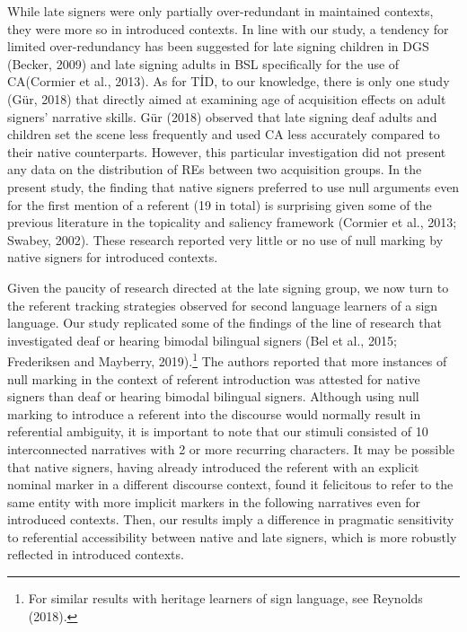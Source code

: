 \documentclass[]{elsarticle} %
\begin{document}
While late signers were only partially over-redundant in maintained
contexts, they were more so in introduced contexts. In line with our
study, a tendency for limited over-redundancy has been suggested for
late signing children in DGS (Becker, 2009) and late signing adults in
BSL specifically for the use of CA(Cormier et al., 2013). As for TİD, to
our knowledge, there is only one study (Gür, 2018) that directly aimed
at examining age of acquisition effects on adult signers' narrative
skills. Gür (2018) observed that late signing deaf adults and children
set the scene less frequently and used CA less accurately compared to
their native counterparts. However, this particular investigation did
not present any data on the distribution of REs between two acquisition
groups. In the present study, the finding that native signers preferred
to use null arguments even for the first mention of a referent (19 in
total) is surprising given some of the previous literature in the
topicality and saliency framework (Cormier et al., 2013; Swabey, 2002).
These research reported very little or no use of null marking by native
signers for introduced contexts.

Given the paucity of research directed at the late signing group, we now
turn to the referent tracking strategies observed for second language
learners of a sign language. Our study replicated some of the findings
of the line of research that investigated deaf or hearing bimodal
bilingual signers (Bel et al., 2015; Frederiksen and Mayberry,
2019).\footnote{For similar results with heritage learners of sign language, see Reynolds (2018).}
The authors reported that more instances of null marking in the context
of referent introduction was attested for native signers than deaf or
hearing bimodal bilingual signers. Although using null marking to
introduce a referent into the discourse would normally result in
referential ambiguity, it is important to note that our stimuli
consisted of 10 interconnected narratives with 2 or more recurring
characters. It may be possible that native signers, having already
introduced the referent with an explicit nominal marker in a different
discourse context, found it felicitous to refer to the same entity with
more implicit markers in the following narratives even for introduced
contexts. Then, our results imply a difference in pragmatic sensitivity
to referential accessibility between native and late signers, which is
more robustly reflected in introduced contexts.
\end{document}
